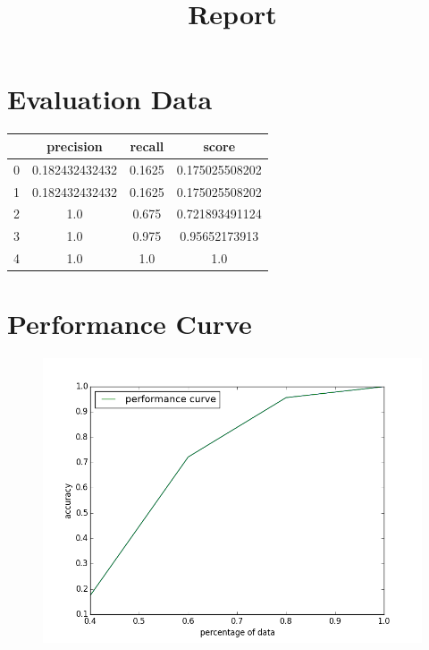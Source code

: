 \documentclass[a4paper,10pt]{article}
\begin{document}
\title{Report}
\maketitle
\section*{Evaluation Data}
 
\begin{table}[htbp]
\centering
\begin{tabular}{|c|c|c|c|}
\hline
&precision&recall&score\\
\hline
				0&0.182432432432&0.1625&0.175025508202\\
1&0.182432432432&0.1625&0.175025508202\\
2&1.0&0.675&0.721893491124\\
3&1.0&0.975&0.95652173913\\
4&1.0&1.0&1.0\\

\hline
\end{tabular}
\end{table}
				 
\section*{Performance Curve}
\begin{figure}[!htbp]
\centering
\includegraphics[width = 15cm]{performance.png} 
\end{figure}
\end{document}
